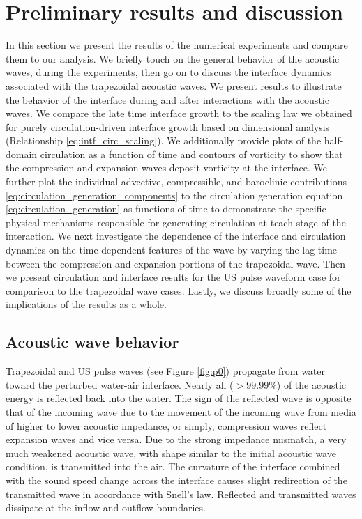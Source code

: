 \section{Preliminary results and discussion}%
\label{sec:usbe_lung_results}%
%
In this section we present the results of the numerical experiments
and compare them to our analysis. We briefly touch on the general
behavior of the acoustic waves, during the experiments, then go on to
discuss the interface dynamics associated with the trapezoidal
acoustic waves. We present results to illustrate the behavior of the
interface during and after interactions with the acoustic waves. We
compare the late time interface growth to the scaling law we obtained
for purely circulation-driven interface growth based on dimensional
analysis (Relationship \eqref{eq:intf_circ_scaling}). We additionally
provide plots of the half-domain circulation as a function of time and
contours of vorticity to show that the compression and expansion waves
deposit vorticity at the interface. We further plot the individual
advective, compressible, and baroclinic contributions
\eqref{eq:circulation_generation_components} to the circulation
generation equation \eqref{eq:circulation_generation} as functions of
time to demonstrate the specific physical mechanisms responsible for
generating circulation at teach stage of the interaction. We next
investigate the dependence of the interface and circulation dynamics
on the time dependent features of the wave by varying the lag time
between the compression and expansion portions of the trapezoidal
wave. Then we present circulation and interface results for the
\ac{US} pulse waveform case for comparison to the trapezoidal
wave cases. Lastly, we discuss broadly some of the implications of the
results as a whole.

\subsection{Acoustic wave behavior}

Trapezoidal and \ac{US} pulse waves (see Figure \ref{fig:p0})
propagate from water toward the perturbed water-air interface. Nearly
all ($>99.99\%$) of the acoustic energy is reflected back into the
water. The sign of the reflected wave is opposite that of the incoming
wave due to the movement of the incoming wave from media of higher to
lower acoustic impedance, or simply, compression waves reflect
expansion waves and vice versa. Due to the strong impedance mismatch,
a very much weakened acoustic wave, with shape similar to the initial
acoustic wave condition, is transmitted into the air. The curvature of
the interface combined with the sound speed change across the
interface causes slight redirection of the transmitted wave in
accordance with Snell's law. Reflected and transmitted waves dissipate
at the inflow and outflow boundaries.

